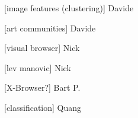 [image features (clustering)] Davide

[art communities] Davide

[visual browser] Nick

[lev manovic] Nick

[X-Browser?] Bart P.

[classification] Quang